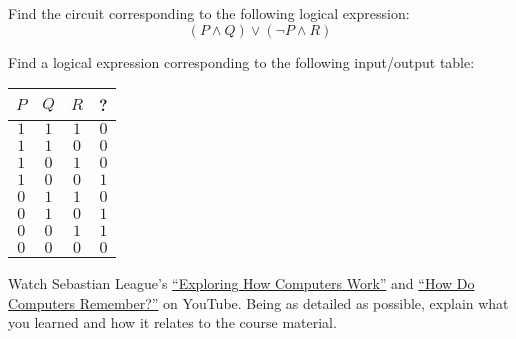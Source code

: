 \documentclass[11pt,letterpaper]{article}
\begin{document}
\newpage



 Find the circuit corresponding to the following logical expression:
	\[
	(P \wedge Q) \vee (\neg P \wedge R)
	\]



\newpage



 Find a logical expression corresponding to the following input/output table: \par
	\begin{table}[h]
	\centering
	\begin{tabular}{c|c|c|c}
	$P$ & $Q$ & $R$ & ? \\ \hline
	$1$ & $1$ & $1$ & $0$ \\
	$1$ & $1$ & $0$ & $0$ \\
	$1$ & $0$ & $1$ & $0$ \\
	$1$ & $0$ & $0$ & $1$ \\
	$0$ & $1$ & $1$ & $0$ \\
	$0$ & $1$ & $0$ & $1$ \\
	$0$ & $0$ & $1$ & $1$ \\
	$0$ & $0$ & $0$ & $0$ 
	\end{tabular}
	\end{table}



\newpage



 Watch Sebastian League's \href{https://www.youtube.com/watch?v=QZwneRb-zqA&ab_channel=SebastianLague}{``Exploring How Computers Work''} and \href{https://www.youtube.com/watch?v=I0-izyq6q5s&ab_channel=SebastianLague}{``How Do Computers Remember?''} on YouTube. Being as detailed as possible, explain what you learned and how it relates to the course material.  
\end{document}
